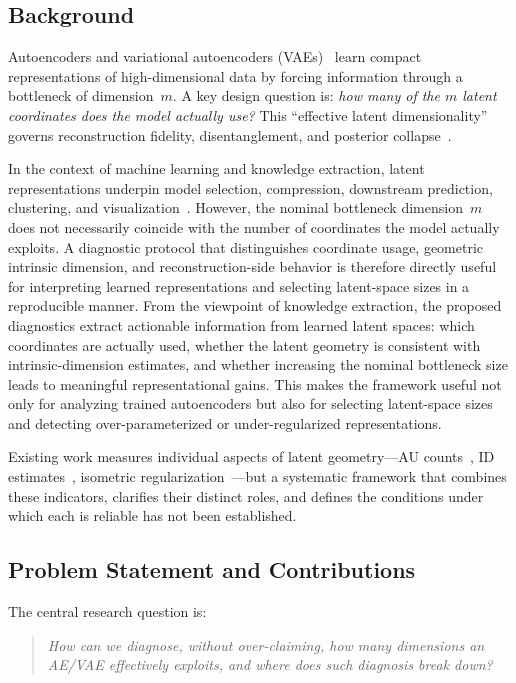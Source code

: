 \documentclass[make,article,submit,pdftex,moreauthors]{Definitions/mdpi}
\begin{document}
\subsection{Background}\label{sec:intro_bg}

Autoencoders and variational autoencoders (VAEs)~\cite{kingma2014vae} learn
compact representations of high-dimensional data by forcing information through
a bottleneck of dimension~$m$.  A key design question is: \emph{how many of
the $m$ latent coordinates does the model actually use?}  This ``effective
latent dimensionality'' governs reconstruction fidelity, disentanglement, and
posterior collapse~\cite{lucas2019elbo}.

In the context of machine learning and knowledge extraction, latent
representations underpin model selection, compression, downstream prediction,
clustering, and visualization~\cite{bengio2013representation}.
However, the nominal bottleneck dimension~$m$ does not necessarily coincide
with the number of coordinates the model actually exploits.
A diagnostic protocol that distinguishes coordinate usage, geometric intrinsic
dimension, and reconstruction-side behavior is therefore directly useful for
interpreting learned representations and selecting latent-space sizes in a
reproducible manner.
From the viewpoint of knowledge extraction, the proposed diagnostics extract
actionable information from learned latent spaces: which coordinates are
actually used, whether the latent geometry is consistent with
intrinsic-dimension estimates, and whether increasing the nominal bottleneck
size leads to meaningful representational gains.
This makes the framework useful not only for analyzing trained autoencoders but
also for selecting latent-space sizes and detecting over-parameterized or
under-regularized representations.

Existing work measures individual aspects of latent geometry—AU
counts~\cite{lucas2019elbo,higgins2017betavae}, ID
estimates~\cite{facco2017twonn,levina2005mle}, isometric
regularization~\cite{kato2020rdae}—but a systematic framework that combines
these indicators, clarifies their distinct roles, and defines the conditions
under which each is reliable has not been established.

\subsection{Problem Statement and Contributions}\label{sec:intro_aim}

The central research question is:
\begin{quote}
\emph{How can we diagnose, without over-claiming, how many dimensions an AE/VAE
effectively exploits, and where does such diagnosis break down?}
\end{quote}
\end{document}
